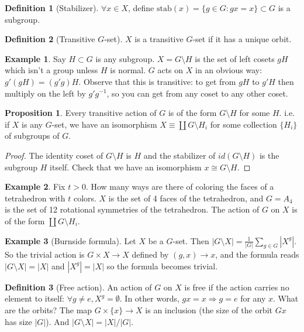 \documentclass[12pt]{article}
\theoremstyle{definition}
\newtheorem{defn}{Definition}
\newtheorem{prop}{Proposition}
\newtheorem{exmp}{Example}[section]
\begin{document}
\begin{defn}[Stabilizer]
    $\forall x \in X$, define $\mathrm{stab}(x) = \{g \in G : gx = x\} \subset
    G$ is a subgroup.
\end{defn}

\begin{defn}[Transitive $G$-set]
    $X$ is a transitive $G$-set if it has a unique orbit.
\end{defn}

\begin{exmp}
    Say $H \subset G$ is any subgroup. $X = G \setminus H$ is the set of left
    cosets $gH$ which isn't a group unless $H$ is normal. $G$ acts on $X$ in an
    obvious way: $g'(gH) = (g'g)H$. Observe that this is transitive: to get
    from $gH$ to $g'H$ then multiply on the left by $g'g^{-1}$, so you can get
    from any coset to any other coset.
\end{exmp}

\begin{prop}
    Every transitive action of $G$ is of the form $G \setminus H$ for some $H$.
    i.e. if $X$ is any $G$-set, we have an isomorphism $X\equiv \coprod G
    \setminus H_i$ for some collection $\{H_i\}$ of subgroups of $G$.
\end{prop}

\begin{proof}
    The identity coset of $G \setminus H$ is $H$ and the stabilizer of $id(G
    \setminus H)$ is the subgroup $H$ itself. Check that we have an isomorphism
    $x \cong G \setminus H$.
\end{proof}

\begin{exmp}
    Fix $t > 0$. How many ways are there of coloring the faces of a tetrahedron
    with $t$ colors. $X$ is the set of 4 faces of the tetrahedron, and $G = A_4$ is
    the set of 12 rotational symmetries of the tetrahedron. The action of $G$
    on $X$ is of the form $\coprod G \setminus H_i$.
\end{exmp}

\begin{exmp}[Burnside formula]
    Let $X$ be a $G$-set. Then $|G \setminus X| = \frac{1}{|G|} \sum_{g \in G}
    |X^g|$. So the trivial action is $G \times X \rightarrow X$ defined by $(g,
    x) \rightarrow x$, and the formula reads $|G \setminus X| = |X|$ and $|X^g|
    = |X|$ so the formula becomes trivial.
\end{exmp}

\begin{defn}[Free action]
    An action of $G$ on $X$ is free if the action carries no element to itself:
    $\forall g \ne e, X^g = \emptyset$. In other words, $gx = x \Rightarrow g =
    e$ for any $x$. What are the orbits? The map $G \times \{x\} \rightarrow X$
    is an inclusion (the size of the orbit $Gx$ has size $|G|$). And $|G
    \setminus X| = |X|/|G|$.
\end{defn}
\end{document}
